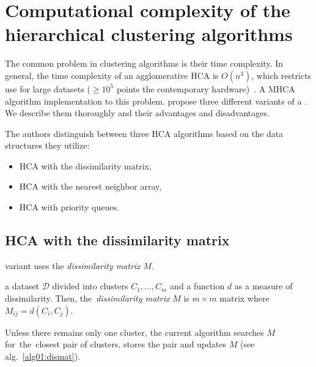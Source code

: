 \section{Computational complexity of the hierarchical clustering algorithms}

The common problem in clustering algorithms is their time complexity. In general, the time complexity of an agglomerative HCA is $O(n^3)$, which restricts  use for large datasets ($\geq10^5$ points  the contemporary hardware)~\cite{sasirekha2013agglomerative}.
A MHCA algorithm implementation  to this problem. \citet{day1984efficient} propose three different variants of a . We describe them thoroughly and  their advantages and disadvantages.

The authors distinguish between three HCA algorithms based on the data structures they utilize:
\begin{itemize}
	\item HCA with the dissimilarity matrix,
	\item HCA with the nearest neighbor array,
	\item HCA with priority queues.
\end{itemize}

\subsection{HCA with the dissimilarity matrix}

 variant uses the \emph{dissimilarity matrix} $M$.

\begin{defn}
	 a dataset $\mathcal{D}$ divided into clusters $C_1,\dots,C_m$ and a function $d$ as a measure of dissimilarity. Then, the~\emph{dissimilarity matrix} $M$ is $m\times m$ matrix where $M_{ij} = d(C_i,C_j)$.
	\label{def01:dismat}
\end{defn}

Unless there remains only one cluster, the current algorithm searches $M$ for~the~closest pair of clusters, stores the pair and updates $M$ (see alg.~\ref{alg01:dismat}).

